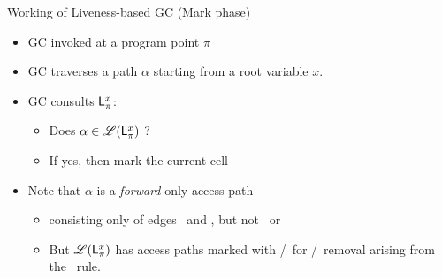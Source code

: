 \documentclass[xcolor=x11names,compress,mathserif]{beamer}
\renewcommand{\(}{\begin{columns}}
\renewcommand{\)}{\end{columns}}
\newcommand{\<}[1]{\begin{column}{#1}}
\renewcommand{\>}{\end{column}}
\begin{document}

\begin{frame}{Working of Liveness-based GC (Mark phase)}
  \begin{itemize}
  \item GC invoked at a program point $\pi$
  \item GC traverses a path $\alpha$ starting from a root variable $x$.
  \item GC consults $\mathsf{L}_{{\pi}}^{x}$: 
    \begin{itemize}
    \item Does $\alpha \in \mathscr{L}(\mathsf{L}_{{\pi}}^{x})$ ?
    \item If yes, then mark the current cell
    \end{itemize}
    \pause
  \item  Note  that  $\alpha$  is a  {\em  forward}-only  access  path
    \begin{itemize}
    \item consisting  only of  edges \acar\  and \acdr,  but not  \bcar\ or
      \bcdr
    \item But $\mathscr{L}(\mathsf{L}_{{\pi}}^{x})$ has access paths marked with \bcar/\bcdr\ for \acar/\acdr\  removal
  arising from the \CONS\  rule.
    \end{itemize}
  \end{itemize}
\end{frame}


\end{document}

